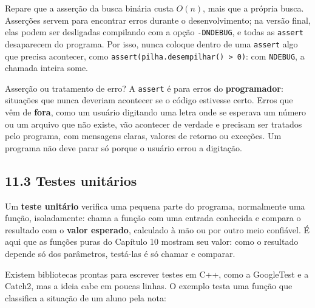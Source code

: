 Repare que a asserção da busca binária custa $O(n)$, mais que a própria busca. Asserções servem para encontrar erros durante o desenvolvimento; na versão final, elas podem ser desligadas compilando com a opção \texttt{-DNDEBUG}, e todas as \texttt{assert} desaparecem do programa. Por isso, nunca coloque dentro de uma \texttt{assert} algo que precisa acontecer, como \texttt{assert(pilha.desempilhar() > 0)}: com \texttt{NDEBUG}, a chamada inteira some.

\begin{destaque}{Asserção ou tratamento de erro?}
A \texttt{assert} é para erros do \textbf{programador}: situações que nunca deveriam acontecer se o código estivesse certo. Erros que vêm de \textbf{fora}, como um usuário digitando uma letra onde se esperava um número ou um arquivo que não existe, vão acontecer de verdade e precisam ser tratados pelo programa, com mensagens claras, valores de retorno ou exceções. Um programa não deve parar só porque o usuário errou a digitação.
\end{destaque}

\subsection{11.3 Testes unitários}

Um \textbf{teste unitário} verifica uma pequena parte do programa, normalmente uma função, isoladamente: chama a função com uma entrada conhecida e compara o resultado com o \textbf{valor esperado}, calculado à mão ou por outro meio confiável. É aqui que as funções puras do Capítulo 10 mostram seu valor: como o resultado depende só dos parâmetros, testá-las é só chamar e comparar.

Existem bibliotecas prontas para escrever testes em C++, como a GoogleTest e a Catch2, mas a ideia cabe em poucas linhas. O exemplo testa uma função que classifica a situação de um aluno pela nota:

